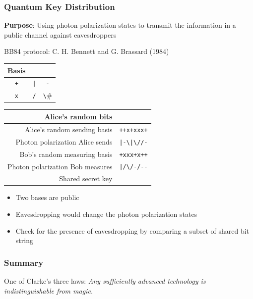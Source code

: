 \begin{frame}[fragile]\frametitle{Quantum Key Distribution}
\textbf{Purpose}: Using photon polarization states to transmit the information in a public channel against eavesdroppers

\begin{exampleblock}{BB84 protocol: C. H. Bennett and G. Brassard (1984)}
{\centering	
\begin{tabular}{|c|c|c|} \hline
Basis & \verb#0# & \verb#1# \\ \hline
\verb#+# & \verb#|# & \verb#-# \\ \hline
\verb#x# & \verb#/# & \verb#\# \\ \hline
\end{tabular}	
\begin{tabular}{|r|c|} \hline
Alice's random bits & \verb#01101001# \\ \hline
Alice's random sending basis & \verb#++x+xxx+# \\ \hline
Photon polarization Alice sends & \verb#|-\|\//-# \\ \hline
Bob's random measuring basis & \verb#+xxx+x++# \\ \hline
Photon polarization Bob measures & \verb#|/\/-/--# \\ \hline
Shared secret key & \verb#0 1  0 1# \\ \hline
\end{tabular}
}
\begin{itemize}
\item Two bases are public
\item Eavesdropping would change the photon polarization states
\item Check for the presence of eavesdropping by comparing a subset of shared bit string
\end{itemize}
\end{exampleblock}
\end{frame}

\begin{frame}\frametitle{Summary}
One of Clarke’s three laws: \it{Any sufficiently advanced technology is indistinguishable from magic.}

\end{frame}
